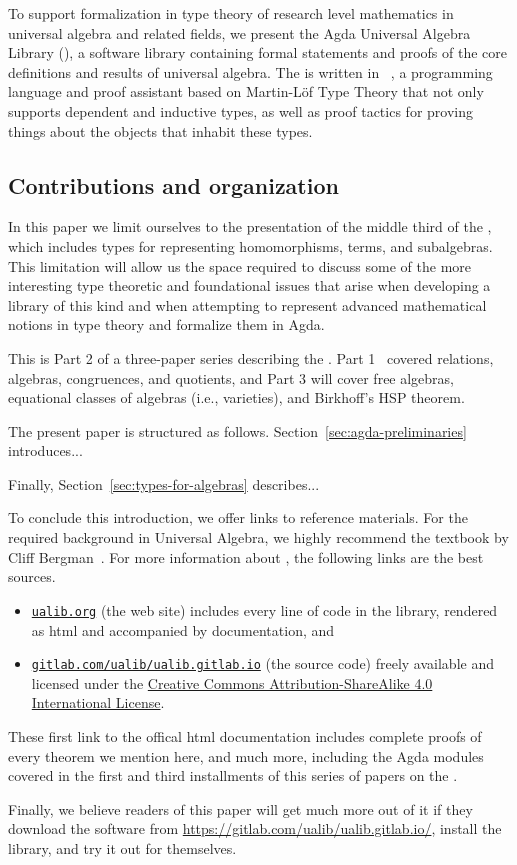 To support formalization in type theory of research level mathematics in universal algebra and related fields, we present the Agda Universal Algebra Library (\agdaualib), a software library containing formal statements and proofs of the core definitions and results of universal algebra. 
The \ualib is written in \agda~\cite{Norell:2009}, a programming language and proof assistant based on Martin-L\"of Type Theory that not only supports dependent and inductive types, as well as proof tactics for proving things about the objects that inhabit these types.

\subsection{Contributions and organization}
\label{sec:contributions}

In this paper we limit ourselves to the presentation of the middle third of the \ualib, which includes types for representing homomorphisms, terms, and subalgebras. This limitation will allow us the space required to discuss some of the more interesting type theoretic and foundational issues that arise when developing a library of this kind and when attempting to represent advanced mathematical notions in type theory and formalize them in Agda.

This is Part 2 of a three-paper series describing the \agdaualib. Part 1~\cite{DeMeo:2021-1} covered relations, algebras, congruences, and quotients, and Part 3 will cover free algebras, equational classes of algebras (i.e., varieties), and Birkhoff's HSP theorem.

The present paper is structured as follows.
%
Section~\ref{sec:agda-preliminaries} introduces...

Finally, Section~\ref{sec:types-for-algebras} describes...
%

To conclude this introduction, we offer links to reference materials.  For the required background in Universal Algebra, we highly recommend the textbook by Cliff Bergman~\cite{Bergman:2012}.  For more information about \agdaualib, the following links are the best sources.
\begin{itemize}
  \item \href{https://ualib.gitlab.io}{\texttt{ualib.org}} (the web site) includes every line of code in the library, rendered as html and accompanied by documentation, and
  \item \href{https://gitlab.com/ualib/ualib.gitlab.io}{\texttt{gitlab.com/ualib/ualib.gitlab.io}} (the source code) freely available and licensed under the \href{https://creativecommons.org/licenses/by-sa/4.0/}{Creative Commons Attribution-ShareAlike 4.0 International License}.
\end{itemize}
These first link to the offical \ualib html documentation includes complete proofs of every theorem we mention here, and much more, including the Agda modules covered in the first and third installments of this series of papers on the \ualib.

Finally, we believe readers of this paper will get much more out of it if they download the software from \url{https://gitlab.com/ualib/ualib.gitlab.io/}, install the library, and try it out for themselves.
